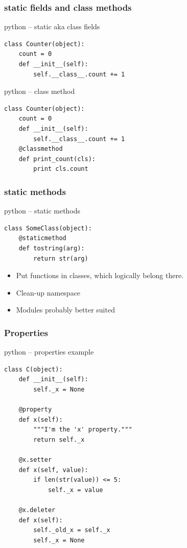 \documentclass{beamer}
\begin{document}
\begin{frame}[fragile]
	\frametitle{static fields and class methods}
	\begin{exampleblock}{python -- static aka class fields}
	\begin{lstlisting}
class Counter(object):
    count = 0
    def __init__(self):
        self.__class__.count += 1
	\end{lstlisting}
	\end{exampleblock}
\pause
	\begin{exampleblock}{python -- class method}
	\begin{lstlisting}
class Counter(object):
    count = 0
    def __init__(self):
        self.__class__.count += 1
    @classmethod
    def print_count(cls):
        print cls.count
	\end{lstlisting}
	\end{exampleblock}
\end{frame}

\begin{frame}[fragile]
	\frametitle{static methods}
	\begin{exampleblock}{python -- static methods}
	\begin{lstlisting}
class SomeClass(object):
    @staticmethod
    def tostring(arg):
        return str(arg)
	\end{lstlisting}
	\end{exampleblock}
\pause
	\begin{itemize}
		\item Put functions in classes, which logically belong there.
		\item Clean-up namespace
		\item Modules probably better suited
	\end{itemize}
\end{frame}

\begin{frame}[fragile]
	\frametitle{Properties}
	
	\begin{exampleblock}{python -- properties example}
	\begin{lstlisting}
class C(object):
    def __init__(self):
        self._x = None

    @property
    def x(self):
        """I'm the 'x' property."""
        return self._x

    @x.setter
    def x(self, value):
        if len(str(value)) <= 5:
            self._x = value

    @x.deleter
    def x(self):
    	self._old_x = self._x
        self._x = None
	\end{lstlisting}
	\end{exampleblock}
\end{frame}
\end{document}
